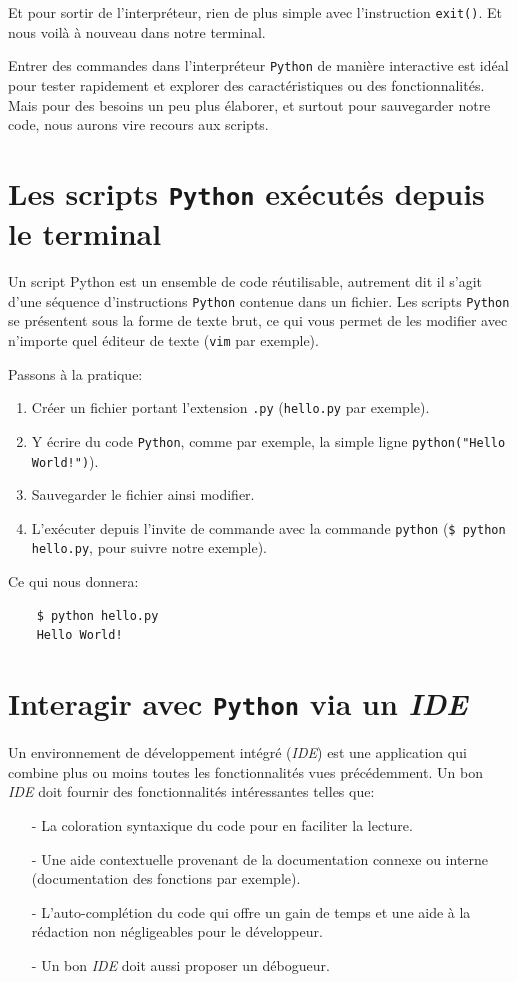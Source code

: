 \documentclass[a4paper,11pt]{book}
\begin{document}
Et pour sortir de l'interpréteur, rien de plus simple avec l'instruction \texttt{exit()}. Et nous voilà à nouveau dans notre terminal.
\medskip

Entrer des commandes dans l'interpréteur \texttt{Python} de manière interactive est idéal pour tester rapidement et explorer des caractéristiques ou des fonctionnalités. Mais pour des besoins un peu plus élaborer, et surtout pour sauvegarder notre code, nous aurons vire recours aux scripts.
\medskip

\section{Les scripts \texttt{Python} exécutés depuis le terminal}
Un script Python est un ensemble de code réutilisable, autrement dit il s'agit d'une séquence d'instructions \texttt{Python} contenue dans un fichier. Les scripts \texttt{Python} se présentent sous la forme de texte brut, ce qui vous permet de les modifier avec n'importe quel éditeur de texte (\texttt{vim} par exemple).
\medskip

Passons à la pratique:
\begin{enumerate}
	\item Créer un fichier portant l'extension \texttt{.py} (\texttt{hello.py} par exemple).
	\item Y écrire du code \texttt{Python}, comme par exemple, la simple ligne \texttt{python("Hello World!")}).
	\item Sauvegarder le fichier ainsi modifier.
	\item L'exécuter depuis l'invite de commande avec la commande \texttt{python} (\verb|$ python hello.py|, pour suivre notre exemple).
\end{enumerate}
\medskip

Ce qui nous donnera:
\begin{verbatim}
    $ python hello.py
    Hello World!
\end{verbatim}

\section{Interagir avec \texttt{Python} via un \textit{IDE}}
Un environnement de développement intégré (\textit{IDE}) est une application qui combine plus ou moins toutes les fonctionnalités vues précédemment. Un bon \textit{IDE} doit fournir des fonctionnalités intéressantes telles que:
\begin{itemize}
	\item[-] La coloration syntaxique du code pour en faciliter la lecture.
	\item[-] Une aide contextuelle provenant de la documentation connexe ou interne (documentation des fonctions par exemple).
	\item[-] L'auto-complétion du code qui offre un gain de temps et une aide à la rédaction non négligeables pour le développeur.
	\item[-] Un bon \textit{IDE} doit aussi proposer un débogueur.
\end{itemize}
\medskip
\end{document}
